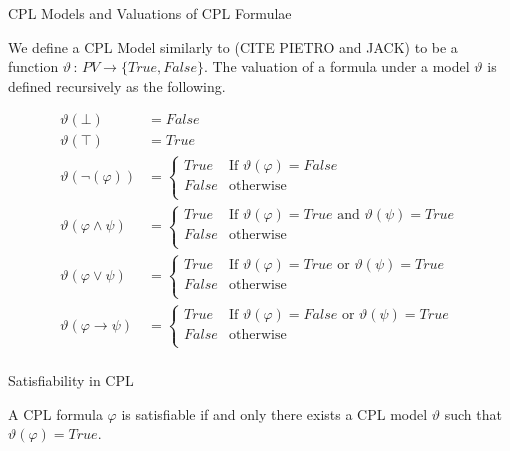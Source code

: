 \documentclass{llncs}
\begin{document}
\begin{definition}{CPL Models and Valuations of CPL Formulae}\label{CPL Model}

We define a CPL Model similarly to (CITE PIETRO and JACK) to be a function
$\vartheta \, : \, PV \rightarrow \{True, False\}$. The valuation of a formula
under a model $\vartheta$ is defined recursively as the following.

\begin{align*}
\vartheta (\bot) &= False \\
\vartheta (\top) &= True \\
\vartheta (\neg(\varphi)) &=
\begin{cases}
True & \textrm{If } \vartheta(\varphi) = False \\
False & \textrm{otherwise} \\
\end{cases} \\
\vartheta (\varphi \wedge \psi) &=
\begin{cases}
True & \textrm{If } \vartheta(\varphi) = True \textrm{ and } \vartheta(\psi) =
True \\
False & \textrm{otherwise} \\
\end{cases} \\
\vartheta (\varphi \vee \psi) &=
\begin{cases}
True & \textrm{If } \vartheta(\varphi) = True \textrm{ or } \vartheta(\psi) =
True \\
False & \textrm{otherwise} \\
\end{cases} \\
\vartheta (\varphi \rightarrow \psi) &=
\begin{cases}
True & \textrm{If } \vartheta(\varphi) = False \textrm{ or } \vartheta(\psi) =
True \\
False & \textrm{otherwise} \\
\end{cases} \\
\end{align*}
\end{definition}

\begin{definition}{Satisfiability in CPL}\label{Satisfiability in CPL}

A CPL formula $\varphi$ is satisfiable if and only there exists a CPL model
$\vartheta$ such that $\vartheta(\varphi) = True$.
\end{definition}
\end{document}
